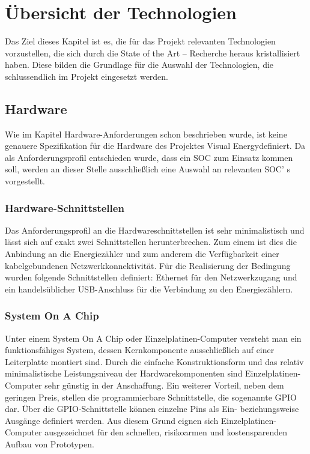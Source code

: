 \documentclass[../Bachelorarbeit.tex]{subfiles}
\begin{document}
\section{Übersicht der Technologien}
Das Ziel dieses Kapitel ist es, die für das Projekt relevanten Technologien vorzustellen, die
sich durch die State of the Art – Recherche heraus kristallisiert haben. Diese bilden die 
Grundlage für die Auswahl der Technologien, die schlussendlich im Projekt eingesetzt 
werden.

\subsection{Hardware}
Wie im Kapitel Hardware-Anforderungen schon beschrieben wurde, ist keine genauere 
Spezifikation für die Hardware des Projektes Visual Energydefiniert. Da als 
Anforderungsprofil entschieden wurde, dass ein \acs{SOC} zum Einsatz kommen soll, werden 
an dieser Stelle ausschließlich eine Auswahl an relevanten \acs{SOC}' s vorgestellt.

\subsubsection*{Hardware-Schnittstellen}
Das Anforderungsprofil an die Hardwareschnittstellen ist sehr minimalistisch und lässt sich
auf exakt zwei Schnittstellen herunterbrechen. Zum einem ist dies die Anbindung an die 
Energiezähler und zum anderem die Verfügbarkeit einer kabelgebundenen 
Netzwerkkonnektivität. Für die Realisierung der Bedingung wurden folgende Schnittstellen
definiert: Ethernet für den Netzwerkzugang und ein handelsüblicher USB-Anschluss für die
Verbindung zu den Energiezählern.

\subsubsection*{System On A Chip}
\label{subsubsec:system_on_a_chip}
Unter einem System On A Chip oder Einzelplatinen-Computer versteht man ein funktionsfähiges System, dessen Kernkomponente ausschließlich auf einer Leiterplatte montiert sind. Durch die einfache
Konstruktionsform und das relativ minimalistische Leistungsniveau der 
Hardwarekomponenten sind Einzelplatinen-Computer sehr günstig in der Anschaffung. Ein
weiterer Vorteil, neben dem geringen Preis, stellen die programmierbare Schnittstelle, 
die sogenannte \acf{GPIO} dar. Über die \ac{GPIO}-Schnittstelle können
einzelne Pins als Ein- beziehungsweise Ausgänge definiert werden. Aus diesem Grund 
eignen sich Einzelplatinen-Computer ausgezeichnet für den schnellen,  risikoarmen und 
kostensparenden Aufbau von Prototypen.
\end{document}
